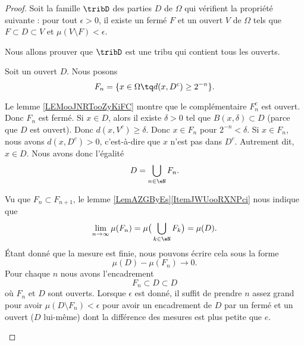 \begin{proof}
	Soit la famille \( \tribD\) des parties \( D\) de \( \Omega\) qui vérifient la propriété suivante : pour tout \( \epsilon>0\), il existe un fermé \( F\) et un ouvert \( V\) de \( \Omega\) tels que \( F\subset D\subset V\) et \( \mu(V\setminus F)<\epsilon\).

	Nous allons prouver que \( \tribD\) est une tribu qui contient tous les ouverts.

	\begin{subproof}
		Soit un ouvert \( D\). Nous posons
		\begin{equation}
			F_n=\{ x\in \Omega\tq d(x,D^c)\geq 2^{-n} \}.
		\end{equation}
		\begin{subproof}

			Le lemme \ref{LEMooJNRTooZyKiFC} montre que le complémentaire \( F_n^c\) est ouvert. Donc \( F_n\) est fermé.
			Si \( x\in D\), alors il existe \( \delta>0\) tel que \( B(x,\delta)\subset D\) (parce que \( D\) est ouvert). Donc \( d(x,V^c)\geq \delta\). Donc \( x\in F_n\) pour \( 2^{-n}<\delta\).
			Si \( x\in F_n\), nous avons \( d(x,D^c)>0\), c'est-à-dire que \( x\) n'est pas dans \( D^c\). Autrement dit, \( x\in D\).
			\spitem[\( \bigcup_{n\in \eN}F_n = D\)]
			Nous avons donc l'égalité
			\begin{equation}
				D=\bigcup_{n\in \eN}F_n.
			\end{equation}
		\end{subproof}
		Vu que \( F_n\subset F_{n+1}\), le lemme \ref{LemAZGByEs}\ref{ItemJWUooRXNPci} nous indique que
		\begin{equation}
			\lim_{n\to \infty} \mu(F_n)=\mu\big( \bigcup_{k\in \eN}F_k \big)=\mu(D).
		\end{equation}
		Étant donné que la mesure est finie, nous pouvons écrire cela sous la forme
		\begin{equation}
			\mu(D)-\mu(F_n)\to 0.
		\end{equation}
		Pour chaque \( n\) nous avons l'encadrement
		\begin{equation}
			F_n\subset D\subset D
		\end{equation}
		où \( F_n\) et \( D\) sont ouverts. Lorsque \( \epsilon\) est donné, il suffit de prendre \( n\) assez grand pour avoir \( \mu(D\setminus F_n)<\epsilon\) pour avoir un encadrement de \( D\) par un fermé et un ouvert (\( D\) lui-même) dont la différence des mesures est plus petite que \( e\).


\end{subproof}
\end{proof}
